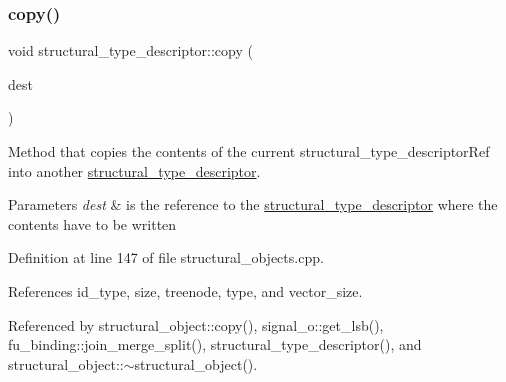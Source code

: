 \subsubsection{\texorpdfstring{copy()}{copy()}}
{\footnotesize\ttfamily void structural\+\_\+type\+\_\+descriptor\+::copy (\begin{DoxyParamCaption}\item[{\hyperlink{structural__objects_8hpp_a219296792577e3292783725961506c83}{structural\+\_\+type\+\_\+descriptor\+Ref}}]{dest }\end{DoxyParamCaption})}



Method that copies the contents of the current structural\+\_\+type\+\_\+descriptor\+Ref into another \hyperlink{structstructural__type__descriptor}{structural\+\_\+type\+\_\+descriptor}. 


\begin{DoxyParams}{Parameters}
{\em dest} & is the reference to the \hyperlink{structstructural__type__descriptor}{structural\+\_\+type\+\_\+descriptor} where the contents have to be written \\
\hline
\end{DoxyParams}


Definition at line 147 of file structural\+\_\+objects.\+cpp.



References id\+\_\+type, size, treenode, type, and vector\+\_\+size.



Referenced by structural\+\_\+object\+::copy(), signal\+\_\+o\+::get\+\_\+lsb(), fu\+\_\+binding\+::join\+\_\+merge\+\_\+split(), structural\+\_\+type\+\_\+descriptor(), and structural\+\_\+object\+::$\sim$structural\+\_\+object().

